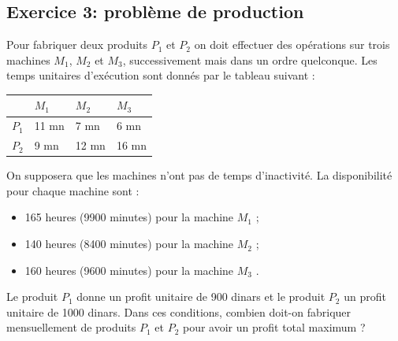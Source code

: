 \documentclass[]{book}
\begin{document}
\subsection*{Exercice 3: problème de production }
Pour fabriquer deux produits $P_1$ et $P_2$ on doit effectuer des opérations sur trois machines $M_1$, $M_2$ et $M_3$, successivement mais dans un ordre quelconque. Les temps unitaires d’exécution sont donnés par le tableau suivant :
\begin{center}
\begin{tabular}{ | m{1cm} | m{1cm}| m{1cm} | m{1cm} | } 
  \hline
    & $M_1$ & $M_2$ & $M_3$\\ 
    \hline
    $P_1$ & 11 mn & 7 mn & 6 mn\\  
    \hline
    $P_2$ & 9 mn & 12 mn & 16 mn\\
    \hline
\end{tabular}
\end{center}
On supposera que les machines n’ont pas de temps d’inactivité.
La disponibilité pour chaque machine sont :
\begin{itemize}
    \item 165 heures (9900 minutes) pour la machine $M_1$ ;
    \item 140 heures (8400 minutes) pour la machine $M_2$ ;
    \item 160 heures (9600 minutes) pour la machine $M_3$ .
\end{itemize}
Le produit $P_1$ donne un profit unitaire de 900 dinars et le produit $P_2$ un profit unitaire de 1000 dinars.
Dans ces conditions, combien doit-on fabriquer mensuellement de produits $P_1$ et $P_2$ pour avoir un profit total maximum ?
\end{document}
